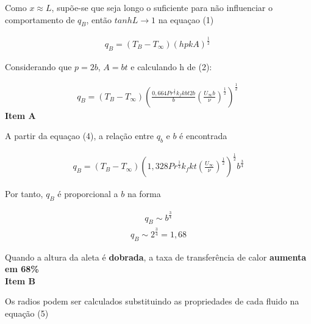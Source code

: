 \documentclass[12pt]{article}
\begin{document}
Como $x\approx L$, supõe-se que seja longo o suficiente para não influenciar o comportamento de $q_{B}$, então $tanhL\rightarrow1$ na equaçao (1)

\begin{equation}
	\begin{aligned}
		q_{B} = (T_{B} - T_{\infty})(hpkA)^{\frac{1}{2}}\  
	\end{aligned}
\end{equation}

Considerando que $p=2b$, $A=bt$ e calculando h de (2):



\begin{equation}
	\begin{aligned}
		q_{B} = (T_{B} - T_{\infty})\left(\frac{0,664Pr^{\frac{1}{3}}k_{f}kbt2b}{b}\left(\frac{U_{\infty}b}{\nu}\right)^{\frac{1}{2}}\right)^{\frac{1}{2}}\  
	\end{aligned}
\end{equation}
\textbf{Item A}

A partir da equaçao (4), a relação entre $q_{b}$ e $b$ é encontrada 

\begin{equation}
	\begin{aligned}
		q_{B} = (T_{B} - T_{\infty})\left(1,328Pr^{\frac{1}{3}}k_{f}kt\left(\frac{U_{\infty}}{\nu}\right)^{\frac{1}{2}}\right)^{\frac{1}{2}} b^{\frac{3}{4}} 
	\end{aligned}
\end{equation}

Por tanto, $q_{B}$ é proporcional a $b$ na forma

\begin{equation}
	\begin{aligned}
		q_{B} \sim b^{\frac{\scriptstyle 3}{\scriptstyle 4}}
	\end{aligned}
\end{equation}
\begin{equation}
	\begin{aligned}
		q_{B} \sim 2^{\frac{\scriptstyle 3}{\scriptstyle 4}} = 1,68
	\end{aligned}
\end{equation}

Quando a altura da aleta é \textbf{dobrada}, a taxa de transferência de calor \textbf{aumenta em 68\%}
\\

\textbf{Item B}

Os radios podem ser calculados substituindo as propriedades de cada fluido na equação (5)
\end{document}
